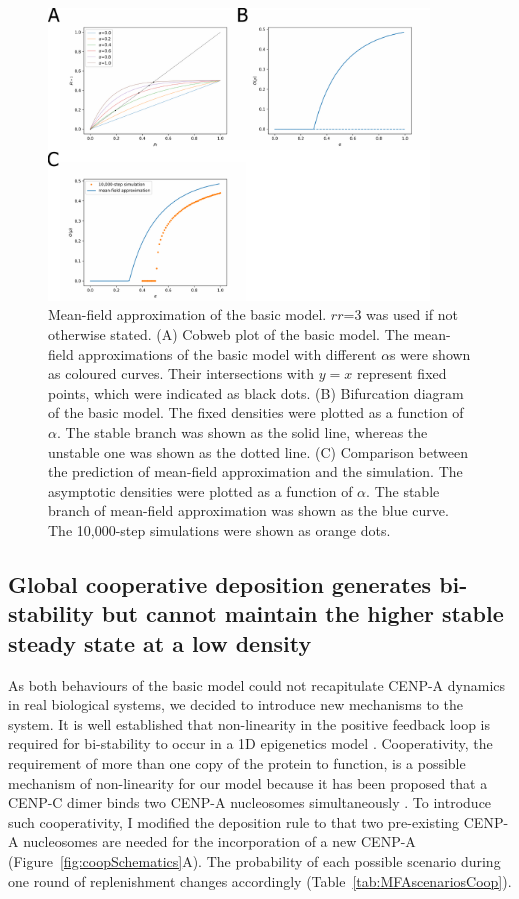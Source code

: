 \begin{figure}[htbp]
  \centering
  \includegraphics[width=0.9\textwidth]{chapter2/figures/mean-field_approximation.pdf}
  \caption[Mean-field approximation of the basic model]{Mean-field approximation of the basic model. $rr$=3 was used if not otherwise stated. (A) Cobweb plot of the basic model. The mean-field approximations of the basic model with different $\alpha$s were shown as coloured curves. Their intersections with $y = x$ represent fixed points, which were indicated as black dots. (B) Bifurcation diagram of the basic model. The fixed densities were plotted as a function of $\alpha$. The stable branch was shown as the solid line, whereas the unstable one was shown as the dotted line. (C) Comparison between the prediction of mean-field approximation and the simulation. The asymptotic densities were plotted as a function of $\alpha$. The stable branch of mean-field approximation was shown as the blue curve. The 10,000-step simulations were shown as orange dots.}
  \label{fig:meanFieldApproximation}
\end{figure}


\subsection{Global cooperative deposition generates bi-stability but cannot maintain the higher stable steady state at a low density}

As both behaviours of the basic model could not recapitulate CENP-A dynamics in real biological systems, we decided to introduce new mechanisms to the system. It is well established that non-linearity in the positive feedback loop is required for bi-stability to occur in a 1D epigenetics model \citep{Dodd2007, Micheelsen2010TheoryLandscapes, Dodd2017}. Cooperativity, the requirement of more than one copy of the protein to function, is a possible mechanism of non-linearity for our model because it has been proposed that a CENP-C dimer binds two CENP-A nucleosomes simultaneously \citep{Walstein2021}. To introduce such cooperativity, I modified the deposition rule to that two pre-existing CENP-A nucleosomes are needed for the incorporation of a new CENP-A (Figure~\ref{fig:coopSchematics}A). The probability of each possible scenario during one round of replenishment changes accordingly (Table~\ref{tab:MFAscenariosCoop}). 

